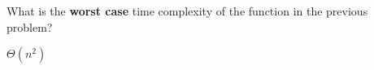 \begin{prob}
    What is the \textbf{worst case} time complexity of the function in the previous problem?

    \begin{soln}
        $\Theta(n^2)$
    \end{soln}

\end{prob}
